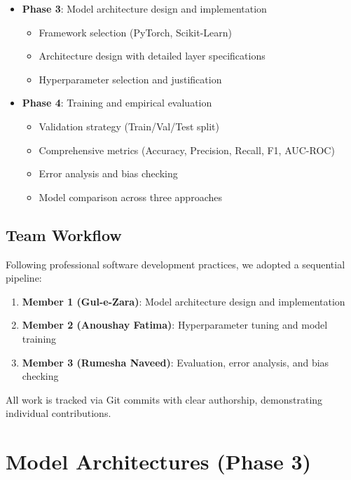 \documentclass[12pt,a4paper]{article}
\begin{document}
\begin{itemize}
    \item \textbf{Phase 3}: Model architecture design and implementation
    \begin{itemize}
        \item Framework selection (PyTorch, Scikit-Learn)
        \item Architecture design with detailed layer specifications
        \item Hyperparameter selection and justification
    \end{itemize}
    
    \item \textbf{Phase 4}: Training and empirical evaluation
    \begin{itemize}
        \item Validation strategy (Train/Val/Test split)
        \item Comprehensive metrics (Accuracy, Precision, Recall, F1, AUC-ROC)
        \item Error analysis and bias checking
        \item Model comparison across three approaches
    \end{itemize}
\end{itemize}

\subsection{Team Workflow}
Following professional software development practices, we adopted a sequential pipeline:

\begin{enumerate}
    \item \textbf{Member 1 (Gul-e-Zara)}: Model architecture design and implementation
    \item \textbf{Member 2 (Anoushay Fatima)}: Hyperparameter tuning and model training
    \item \textbf{Member 3 (Rumesha Naveed)}: Evaluation, error analysis, and bias checking
\end{enumerate}

All work is tracked via Git commits with clear authorship, demonstrating individual contributions.

\section{Model Architectures (Phase 3)}
\end{document}
